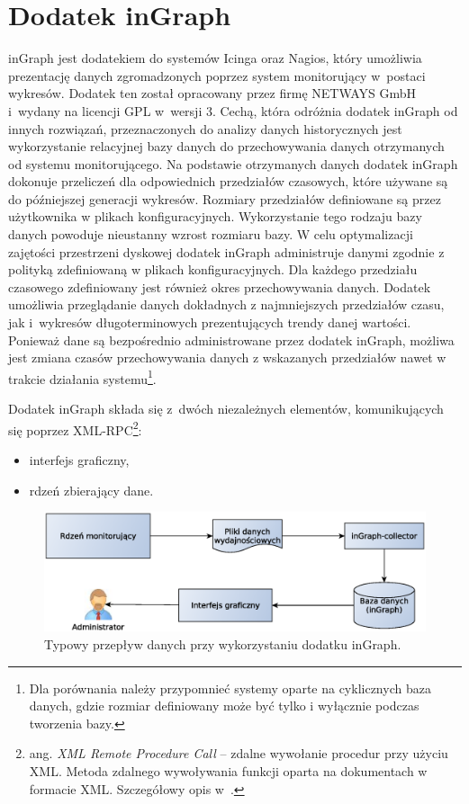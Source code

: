 \section[Dodatek inGraph][Dodatek inGraph]{Dodatek inGraph}
\label{sec:inGraph}

inGraph jest dodatekiem do systemów Icinga oraz Nagios, który
umożliwia prezentację danych zgromadzonych poprzez system monitorujący
w~postaci wykresów. Dodatek ten został opracowany przez firmę NETWAYS
GmbH i~wydany na licencji GPL w~wersji 3. Cechą, która odróżnia
dodatek inGraph od innych rozwiązań, przeznaczonych do analizy danych
historycznych jest wykorzystanie relacyjnej bazy danych do
przechowywania danych otrzymanych od systemu monitorującego. Na
podstawie otrzymanych danych dodatek inGraph dokonuje przeliczeń dla
odpowiednich przedziałów czasowych, które używane są do późniejszej
generacji wykresów. Rozmiary przedziałów definiowane są przez
użytkownika w plikach konfiguracyjnych. Wykorzystanie tego rodzaju
bazy danych powoduje nieustanny wzrost rozmiaru bazy. W celu
optymalizacji zajętości przestrzeni dyskowej dodatek inGraph
administruje danymi zgodnie z polityką zdefiniowaną w plikach
konfiguracyjnych. Dla każdego przedziału czasowego zdefiniowany jest
również okres przechowywania danych. Dodatek umożliwia przeglądanie
danych dokładnych z najmniejszych przedziałów czasu, jak i~wykresów
długoterminowych prezentujących trendy danej wartości. Ponieważ dane
są bezpośrednio administrowane przez dodatek inGraph, możliwa jest
zmiana czasów przechowywania danych z wskazanych przedziałów nawet w
trakcie działania systemu\footnote{Dla porównania należy przypomnieć
  systemy oparte na cyklicznych baza danych, gdzie rozmiar definiowany
  może być tylko i wyłącznie podczas tworzenia bazy.}.

Dodatek inGraph składa się z~dwóch niezależnych elementów,
komunikujących się poprzez XML-RPC\footnote{ang. {\em XML Remote
    Procedure Call} -- zdalne wywołanie procedur przy użyciu
  XML. Metoda zdalnego wywoływania funkcji oparta na dokumentach w
  formacie XML. Szczegółowy opis w~\cite{www:XMLRPC}.}:

\begin{itemize}
\item interfejs graficzny,
\item rdzeń zbierający dane.
\end{itemize}

\begin{figure}[ht]
  \caption{Typowy przepływ danych przy wykorzystaniu dodatku inGraph.}
  \label{fig:inGraphFlow}
\includegraphics[width=1\textwidth]{img/ingraphFlow}
\end{figure}

